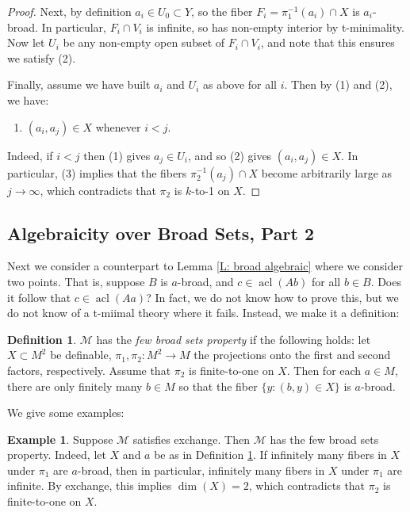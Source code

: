 \documentclass{amsart}
\theoremstyle{definition}
\newtheorem{definition}[theorem]{Definition}
\newtheorem{example}[theorem]{Example}
\newcommand{\acl}{\operatorname{acl}}
\begin{document}
\begin{proof}
    Next, by definition $a_i\in U_0\subset Y$, so the fiber $F_i=\pi_1^{-1}(a_i)\cap X$ is $a_i$-broad. In particular, $F_i\cap V_i$ is infinite, so has non-empty interior by t-minimality. Now let $U_i$ be any non-empty open subset of $F_i\cap V_i$, and note that this ensures we satisfy (2). 

    Finally, assume we have built $a_i$ and $U_i$ as above for all $i$. Then by (1) and (2), we have:

    \begin{enumerate}
        \item[(3)] $(a_i,a_j)\in X$ whenever $i<j$. 
    \end{enumerate}

    Indeed, if $i<j$ then (1) gives $a_j\in U_i$, and so (2) gives $(a_i,a_j)\in X$. In particular, (3) implies that the fibers $\pi_2^{-1}(a_j)\cap X$ become arbitrarily large as $j\rightarrow\infty$, which contradicts that $\pi_2$ is $k$-to-1 on $X$.
\end{proof}

\subsection{Algebraicity over Broad Sets, Part 2}

Next we consider a counterpart to Lemma \ref{L: broad algebraic} where we consider two points. That is, suppose $B$ is $a$-broad, and $c\in\acl(Ab)$ for all $b\in B$. Does it follow that $c\in\acl(Aa)$? In fact, we do not know how to prove this, but we do not know of a t-miimal theory where it fails. Instead, we make it a definition:

\begin{definition}\label{D: few broad sets}
    $\mathcal M$ has the \textit{few broad sets property} if the following holds: let $X\subset M^2$ be definable, $\pi_1, \pi_2: M^2\to M$ the projections onto the first and second factors, respectively. Assume that $\pi_2$  is finite-to-one on $X$. Then for each $a\in M$, there are only finitely many $b\in M$ so that the fiber $\{y:(b,y)\in X\}$ is $a$-broad.
\end{definition}

We give some examples:

\begin{example} Suppose $\mathcal M$ satisfies exchange. Then $\mathcal M$ has the few broad sets property. Indeed, let $X$ and $a$ be as in Definition \ref{D: few broad sets}. If infinitely many fibers in $X$ under $\pi_1$ are $a$-broad, then in particular, infinitely many fibers in $X$ under $\pi_1$ are infinite. By exchange, this implies $\dim(X)=2$, which contradicts that $\pi_2$ is finite-to-one on $X$.  
\end{example}
\end{document}
